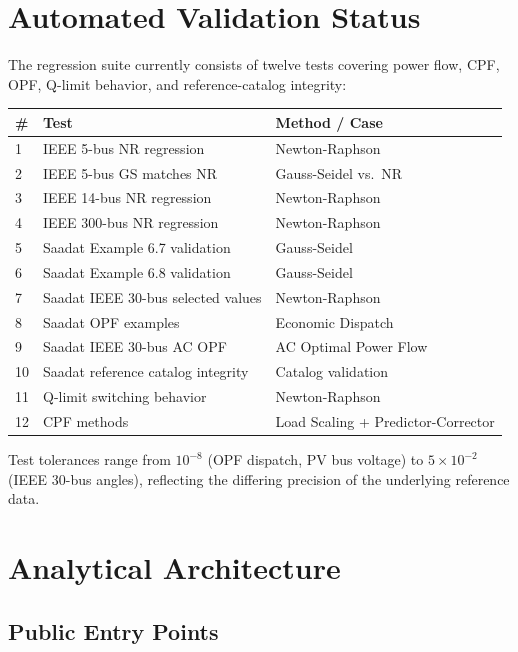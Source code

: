 \documentclass[12pt,a4paper]{article}
\begin{document}
\section{Automated Validation Status}

The regression suite currently consists of twelve tests covering power flow, CPF, OPF, Q-limit behavior, and reference-catalog integrity:

\begin{center}
\begin{tabular}{lll}
\toprule
\# & Test & Method / Case \\
\midrule
1 & IEEE 5-bus NR regression & Newton-Raphson \\
2 & IEEE 5-bus GS matches NR & Gauss-Seidel vs.\ NR \\
3 & IEEE 14-bus NR regression & Newton-Raphson \\
4 & IEEE 300-bus NR regression & Newton-Raphson \\
5 & Saadat Example 6.7 validation & Gauss-Seidel \\
6 & Saadat Example 6.8 validation & Gauss-Seidel \\
7 & Saadat IEEE 30-bus selected values & Newton-Raphson \\
8 & Saadat OPF examples & Economic Dispatch \\
9 & Saadat IEEE 30-bus AC OPF & AC Optimal Power Flow \\
10 & Saadat reference catalog integrity & Catalog validation \\
11 & Q-limit switching behavior & Newton-Raphson \\
12 & CPF methods & Load Scaling + Predictor-Corrector \\
\bottomrule
\end{tabular}
\end{center}



Test tolerances range from $10^{-8}$ (OPF dispatch, PV bus voltage) to $5 \times 10^{-2}$ (IEEE 30-bus angles), reflecting the differing precision of the underlying reference data.

\section{Analytical Architecture}

\subsection{Public Entry Points}
\end{document}
